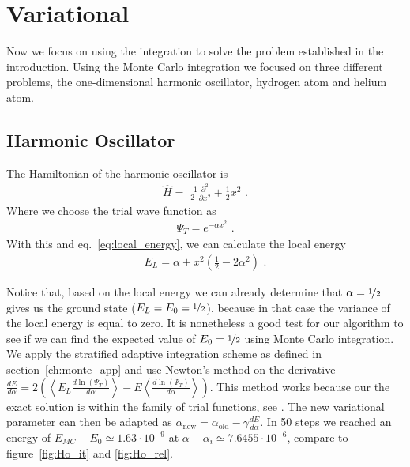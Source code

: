 
\section{Variational}
Now we focus on using the integration to solve the problem established in the introduction.
Using the Monte Carlo integration we focused on three different problems, the one-dimensional harmonic oscillator, hydrogen atom and helium atom.

\subsection{Harmonic Oscillator}
The Hamiltonian of the harmonic oscillator is
\begin{align*}
  \hat{H} = \frac{-1}{2}\frac{\partial^2}{ \partial x^2} + \frac{1}{2} x^2  \text{~.}
\end{align*}
Where we choose the trial wave function as
  \begin{align*}
    \Psi_T = e^{-\alpha x^2} \text{~.}
  \end{align*}
With this and eq.~\eqref{eq:local_energy}, we can calculate the local energy
  \begin{align*}
    E_L = \alpha + x^2(\frac{1}{2} - 2\alpha^2) \text{~.}
  \end{align*}
 	
Notice that, based on the local energy we can already determine that $\alpha = \nicefrac{1}{2}$ gives us the ground state ($E_L = E_0 = \nicefrac{1}{2}$), because in that case the variance of the local energy is equal to zero. It is nonetheless a good test for our algorithm to see if we can find the expected value of $E_0 = \nicefrac{1}{2}$ using Monte Carlo integration.\\
  
We apply the stratified adaptive integration scheme as defined in section~\ref{ch:monte_app} and use Newton's method on the derivative $\frac{dE}{d\alpha} = 2 (\left< E_L \frac{d \ln(\Psi_T)}{d \alpha} \right> - E\left<\frac{d \ln(\Psi_T)}{d \alpha}\right>)$. This method works because our the exact solution is within the family of trial functions, see \cite{JosBook}. %
The new variational parameter can then be adapted as $\alpha_{\text{new}} = \alpha_{\text{old}} - \gamma \frac{dE}{d\alpha} $.
In 50 steps we reached an energy of $E_{MC}-E_0 \simeq 1.63\cdot 10^{-9}$ at $\alpha - \alpha_i \simeq 7.6455\cdot 10^{-6}$, compare to figure~\ref{fig:Ho_it} and \ref{fig:Ho_rel}.

